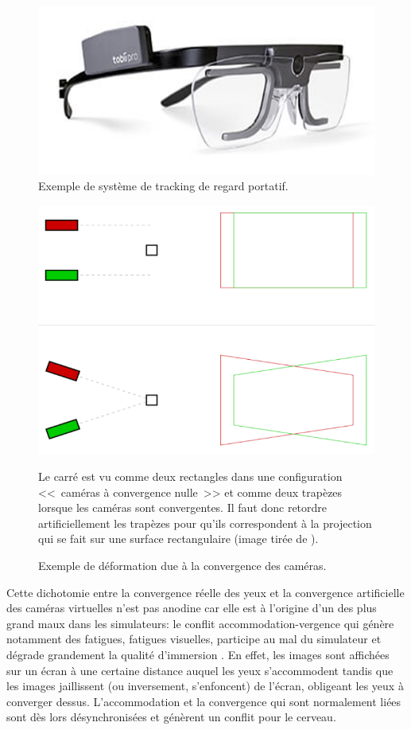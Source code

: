 	\begin{figure}
		\centering
		\includegraphics[scale=1]{Figures/EyeTrackerTobii}
		\caption{Exemple de système de tracking de regard portatif.}
		\label{fig:eye_tracker}
	\end{figure}
	
	\begin{figure}
		\centering
		\includegraphics[scale=.75]{Figures/RedressementPlansVision}
		\caption{Exemple de déformation due à la convergence des caméras.}{Le carré est vu comme deux rectangles dans une configuration <<~caméras à convergence nulle~>> et comme deux trapèzes lorsque les caméras sont convergentes. Il faut donc retordre artificiellement les trapèzes pour qu'ils correspondent à la projection qui se fait sur une surface rectangulaire (image tirée de \citep{aurat_immersion_2016}).}
		\label{fig:redressement_plan_vision}
	\end{figure}
	
	\par Cette dichotomie entre la convergence réelle des yeux et la convergence artificielle des caméras virtuelles n'est pas anodine car elle est à l'origine d'un des plus grand maux dans les simulateurs: le conflit accommodation-vergence qui génère notamment des fatigues, fatigues visuelles, participe au mal du simulateur et dégrade grandement la qualité d'immersion \citep{neveu_impact_2012}. En effet, les images sont affichées sur un écran à une certaine distance auquel les yeux s'accommodent tandis que les images jaillissent (ou inversement, s'enfoncent) de l'écran, obligeant les yeux à converger dessus. L'accommodation et la convergence qui sont normalement liées sont dès lors désynchronisées et génèrent un conflit pour le cerveau.
	
